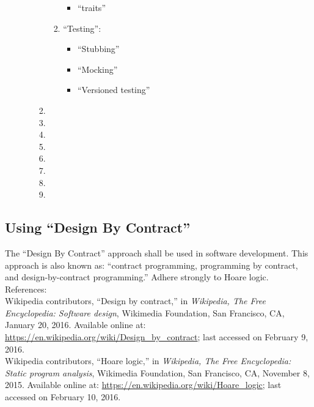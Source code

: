 \begin{enumerate}
\begin{enumerate}
\begin{enumerate}
\begin{enumerate}
\begin{itemize}
				\item ``traits''
				\end{itemize}
			\item ``Testing'': \vspace{-0.1cm}
				\begin{itemize} \itemsep -1pt
				\item ``Stubbing''
				\item ``Mocking''
				\item ``Versioned testing''
				\end{itemize}
			\end{enumerate}
		\item 
		\item 
		\item 
		\item 
		\item 
		\item 
		\item 
		\item 
		\end{enumerate}
	\end{enumerate}
\end{enumerate}






\subsection{Using ``Design By Contract''}
\label{ssec:UsingDesignByContract}

	The ``Design By Contract'' approach shall be used in software development. This approach is also known as: ``contract programming, programming by contract, and design-by-contract programming.'' Adhere strongly to Hoare logic. \\

References: \\
Wikipedia contributors, ``Design by contract,'' in {\it Wikipedia, The Free Encyclopedia: Software design}, Wikimedia Foundation, San Francisco, CA, January 20, 2016. Available online at: \url{https://en.wikipedia.org/wiki/Design_by_contract}; last accessed on February 9, 2016. \\

Wikipedia contributors, ``Hoare logic,'' in {\it Wikipedia, The Free Encyclopedia: Static program analysis}, Wikimedia Foundation, San Francisco, CA, November 8, 2015. Available online at: \url{https://en.wikipedia.org/wiki/Hoare_logic}; last accessed on February 10, 2016. \\

